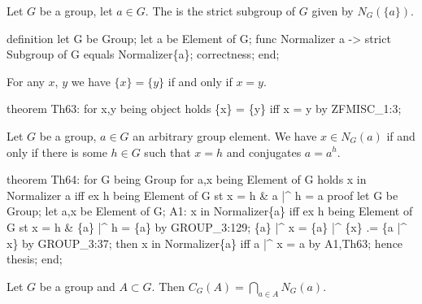 \begin{definition*}
Let $G$ be a group, let $a\in G$. The  is the
strict subgroup of $G$ given by $N_{G}(\{a\})$.
\end{definition*}

\nwenddocs{}\endmoddef\nwstartdeflinemarkup{}\nwenddeflinemarkup
definition
  let G be Group;
  let a be Element of G;
  func Normalizer a -> strict Subgroup of G equals
  Normalizer\{a\};
  correctness;
end;
\nwendcode{}\nwdocspar

\begin{theorem}
For any $x$, $y$ we have $\{x\}=\{y\}$ if and only if $x=y$.
\end{theorem}

\nwenddocs{}\endmoddef\nwstartdeflinemarkup{}\nwenddeflinemarkup
theorem Th63:
  for x,y being object
  holds \{x\} = \{y\} iff x = y by ZFMISC_1:3;
\eatline
{}\nwendcode{}\nwdocspar
\begin{theorem}
Let $G$ be a group, $a\in G$ an arbitrary group element.
We have $x\in N_{G}(a)$ if and only if there is some $h\in G$
such that $x=h$ and conjugates $a = a^{h}$.
\end{theorem}

\nwenddocs{}\endmoddef\nwstartdeflinemarkup{}\nwenddeflinemarkup
theorem Th64:
  for G being Group
  for a,x being Element of G
  holds x in Normalizer a iff ex h being Element of G st x = h & a |^ h = a
proof
  let G be Group;
  let a,x be Element of G;
  A1: x in Normalizer\{a\} iff ex h being Element of G st x = h & \{a\} |^ h = \{a\}
  by GROUP_3:129;
  \{a\} |^ x = \{a\} |^ \{x\}
          .= \{a |^ x\} by GROUP_3:37;
  then x in Normalizer\{a\} iff a |^ x = a by A1,Th63;
  hence thesis;
end;
\eatline
{}\nwendcode{}\nwdocspar
\begin{theorem}
Let $G$ be a group and $A\subset G$.
Then $C_{G}(A) = \bigcap_{a\in A}N_{G}(a)$.
\end{theorem}

